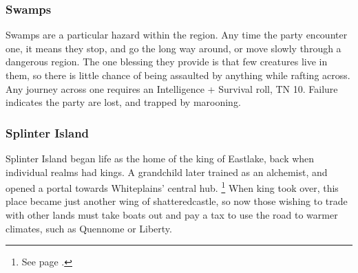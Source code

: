 \begin{multicols}{2}
{}

\subsubsection{Swamps}

Swamps are a particular hazard within the region.
Any time the party encounter one, it means they stop, and go the long way around, or move slowly through a dangerous region.
The one blessing they provide is that few creatures live in them, so there is little chance of being assaulted by anything while rafting across.
Any journey across one requires an Intelligence + Survival roll, TN 10.
Failure indicates the party are lost, and trapped by marooning.

\subsubsection{Splinter Island}

Splinter Island began life as the home of the king of Eastlake, back when individual realms had kings.
A grandchild later trained as an alchemist, and opened a portal towards Whiteplains' central hub.%
\footnote{See page \pageref{whiteland_heart}.}
When \gls{king} took over, this place became just another wing of \gls{shatteredcastle}, so now those wishing to trade with other lands must take boats out and pay a tax to use the road to warmer climates, such as Quennome or Liberty.

\iftoggle{players}{}{
\subsubsection{Seasonal Encounters}

\paragraph{Cold} seasons in Eastlake are terrifying.
Hungry wolves become common; roll $2D6 + 2$ for the number.
Travelling through the cold also inflicts an additional 4 Fatigue Points per day.
\paragraph{Mild} seasons are still snowy in the North of Eastlake, but much of the ice retreats, bringing increased bear activity as they are usually coming out of or going into a state of hibernation.
\paragraph{Stormy} times bring flooding, lightning, and increased snowstorms.
Travelling in these storms slows everyone, and an increase in Fatigue of 3 points per day's travel.
}
\end{multicols}

